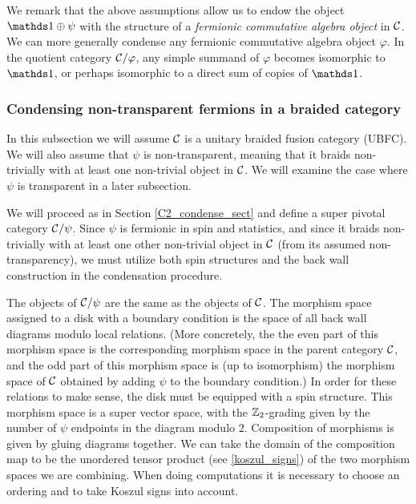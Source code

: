 We remark that the above assumptions allow us to endow the object $\unit\oplus\psi$ 
with the structure of a {\it fermionic commutative algebra object} in $\mathcal{C}$.
We can more generally condense any fermionic commutative algebra object $\varphi$.
In the quotient category $\mathcal{C}/\varphi$, any simple summand of $\varphi$ becomes isomorphic to $\unit$,
or perhaps isomorphic to a direct sum of copies of $\unit$.



\subsubsection{Condensing non-transparent fermions in a braided category}  \label{gntf_condense}


In this subsection we will assume $\mathcal{C}$ is a unitary braided fusion category (UBFC).
We will also assume that $\psi$ is non-transparent, meaning that it braids non-trivially with at least one non-trivial object in $\mathcal{C}$. 
We will examine the case where $\psi$ is transparent in a later subsection. 


We will proceed 
as in Section \ref{C2_condense_sect} and define a super pivotal category $\mathcal{C}/\psi$. 
Since $\psi$ is fermionic in spin and statistics, and since it braids non-trivially with 
at least one other non-trivial object in $\mathcal{C}$ (from its assumed non-transparency), we
must utilize both spin structures and the back wall construction in the condensation 
procedure. 

The objects of $\mathcal{C}/\psi$ are the same as the objects of $\mathcal{C}$.
The morphism space assigned to a disk with a boundary condition is the space of all back wall diagrams
modulo local relations.
(More concretely, the the even part of this morphism space is the corresponding morphism space in the parent category $\mathcal{C}$,
and the odd part of this morphism space is (up to isomorphism) the morphism space of $\mathcal{C}$ 
obtained by adding $\psi$ to the boundary condition.)
In order for these relations to make sense, the disk must be equipped with a spin structure.
This morphism space is a super vector space, with the $\mathbb{Z}_2$-grading given by the number of $\psi$ endpoints in the diagram modulo 2.
Composition of morphisms is given by gluing diagrams together.
We can take the domain of the composition map to be the unordered tensor product (see \ref{koszul_signs})
of the two morphism spaces we are combining.
When doing computations it is necessary to choose an ordering and to take Koszul signs into account.




